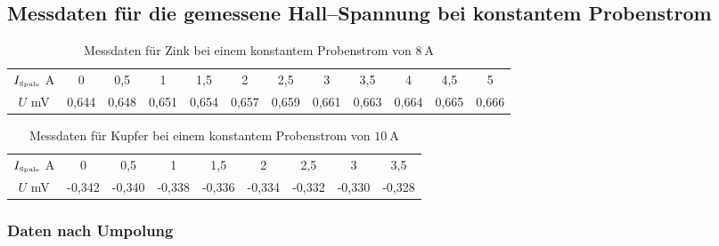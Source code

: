 
\subsection{Messdaten für die gemessene Hall--Spannung bei konstantem Probenstrom}

\begin{table}
 \centering
 \begin{tabular}[width=\textwidth]{S| S[table-format=1.3] S[table-format=1.3] S[table-format=1.3] S[table-format=1.3] S[table-format=1.3] S[table-format=1.3] S[table-format=1.3] S[table-format=1.3] S[table-format=1.3] S[table-format=1.3] S[table-format=1.3]}

     \midrule
      $I_{\text{\tiny{Spule}}}$  \si{\ampere} & 0 & 0,5 & 1 & 1,5 & 2 & 2,5 & 3 & 3,5 & 4 & 4,5 & 5 \\
      $U$  \si{\milli\volt} & 0,644 & 0,648 & 0,651 & 0,654 & 0,657 & 0,659 & 0,661 & 0,663 & 0,664 & 0,665 & 0,666\\
      \bottomrule
\end{tabular}
  \caption{Messdaten für Zink bei einem konstantem Probenstrom von $\SI{8}{\ampere}$}
  \label{tab:Zink_U_H}
\end{table}


\begin{table}
 \centering
 \begin{tabular}[width=\textwidth]{S| S[table-format=2.3] S[table-format=1.3] S[table-format=1.3] S[table-format=1.3] S[table-format=1.3] S[table-format=1.3] S[table-format=1.3] S[table-format=1.3]}

     \midrule
      $I_{\text{\tiny{Spule}}}$  \si{\ampere} & 0 & 0,5 & 1 & 1,5 & 2 & 2,5 & 3 & 3,5 \\
      $U$  \si{\milli\volt} & -0,342 & -0,340 & -0,338 & -0,336 & -0,334 & -0,332 & -0,330 & -0,328 \\
      \bottomrule
\end{tabular}
  \caption{Messdaten für Kupfer bei einem konstantem Probenstrom von $\SI{10}{\ampere}$}
  \label{tab:Kupfer_U_H}
\end{table}

\newpage

\subsubsection{Daten nach Umpolung}

